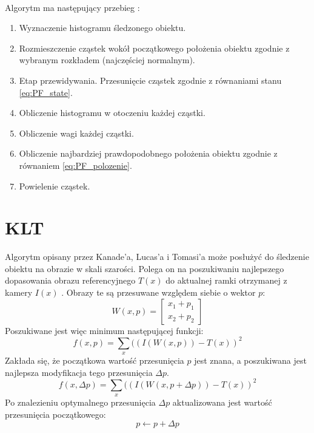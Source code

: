 \paragraph*{}
Algorytm ma następujący przebieg \cite{Meresinski}:
\begin{enumerate}
\item Wyznaczenie histogramu śledzonego obiektu.
\item Rozmieszczenie cząstek wokół początkowego położenia obiektu zgodnie z wybranym rozkładem (najczęściej normalnym).
\item Etap przewidywania. Przesunięcie cząstek zgodnie z równaniami stanu \ref{eq:PF_state}.
\item Obliczenie histogramu w otoczeniu każdej cząstki.
\item Obliczenie wagi każdej cząstki.
\item Obliczenie najbardziej prawdopodobnego położenia obiektu zgodnie z równaniem \ref{eq:PF_polozenie}.
\item Powielenie cząstek.
\end{enumerate}

\section{KLT}
\label{sec:klt}
Algorytm opisany przez Kanade'a, Lucas'a i Tomasi'a może posłużyć do śledzenie obiektu na obrazie w skali szarości. Polega on na poszukiwaniu najlepszego dopasowania obrazu referencyjnego \(T(x)\) do aktualnej ramki otrzymanej z kamery \(I(x)\) \cite{TSK}. Obrazy te są przesuwane względem siebie o wektor \(p\):
\begin{equation}
W(x,p)=
	\begin{bmatrix}
	x_1+p_1 \\
	x_2+p_2
	\end{bmatrix}
\end{equation}
Poszukiwane jest więc minimum następującej funkcji:
\begin{equation}
f(x,p)=\sum\limits_{x}((I(W(x,p))-T(x))^2
\end{equation}
Zakłada się, że początkowa wartość przesunięcia \(p\) jest znana, a poszukiwana jest najlepsza modyfikacja tego przesunięcia \(\Delta p\).
\begin{equation}
f(x,\Delta p)=\sum\limits_{x}((I(W(x,p+\Delta p))-T(x))^2
\end{equation}
Po znalezieniu optymalnego przesunięcia \(\Delta p\) aktualizowana jest wartość przesunięcia początkowego:
\begin{equation}
p \leftarrow p+\Delta p
\end{equation}

